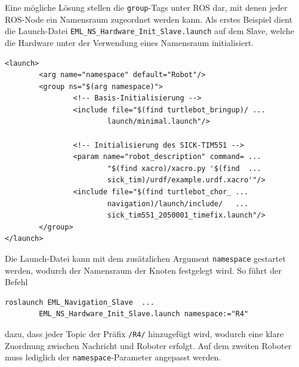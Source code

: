 Eine mögliche Lösung stellen die \lstinline{group}{}-Tags \cite{WikiGroup} unter ROS dar, mit denen jeder ROS-Node ein Namensraum zugeordnet werden kann. Als erstes Beispiel dient die Launch-Datei \lstinline{EML_NS_Hardware_Init_Slave.launch}{} auf dem Slave, welche die Hardware unter der Verwendung eines Namensraum initialisiert.
\begin{lstlisting}[caption={EML\_NS\_Hardware\_Init\_Slave.launch},captionpos=b]
<launch>
        <arg name="namespace" default="Robot"/>
        <group ns="$(arg namespace)">
                <!-- Basis-Initialisierung -->
                <include file="$(find turtlebot_bringup)/ ...
                		launch/minimal.launch"/>

                <!-- Initialisierung des SICK-TIM551 -->
                <param name="robot_description" command= ...
                		"$(find xacro)/xacro.py '$(find  ...
                		sick_tim)/urdf/example.urdf.xacro'"/>
                <include file="$(find turtlebot_chor_ ...
                		navigation)/launch/include/   ...
                		sick_tim551_2050001_timefix.launch"/>
        </group>
</launch>
\end{lstlisting}
Die Launch-Datei kann mit dem zusätzlichen Argument \lstinline{namespace}{} gestartet werden, wodurch der Namensraum der Knoten festgelegt wird. So führt der Befehl
\begin{lstlisting}
roslaunch EML_Navigation_Slave  ...
		EML_NS_Hardware_Init_Slave.launch namespace:="R4"
\end{lstlisting}
dazu, dass jeder Topic der Präfix \lstinline{/R4/}{} hinzugefügt wird, wodurch eine klare Zuordnung zwischen Nachricht und Roboter erfolgt. Auf dem zweiten Roboter muss lediglich der \lstinline{namespace}{}-Parameter angepasst werden.

